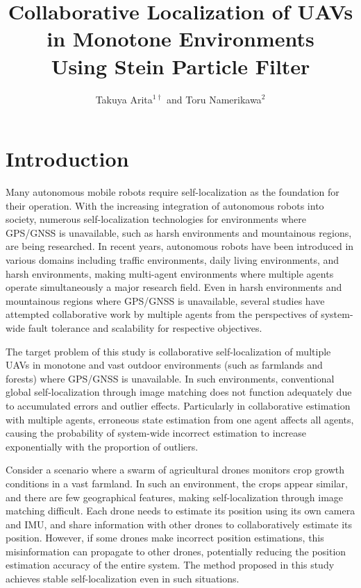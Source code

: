 \documentclass[a4paper,fleqn,10pt,twocolumn]{SICE_ISCS}
\title{Collaborative Localization of UAVs in Monotone Environments\\
	 Using Stein Particle Filter}
\author{Takuya Arita${}^{1\dagger}$ and Toru Namerikawa${}^{2}$}
\begin{document}
\maketitle


\section{Introduction}
Many autonomous mobile robots require self-localization as the foundation for their operation. With the increasing integration of autonomous robots into society, numerous self-localization technologies for environments where GPS/GNSS is unavailable, such as harsh environments and mountainous regions, are being researched. In recent years, autonomous robots have been introduced in various domains including traffic environments, daily living environments, and harsh environments, making multi-agent environments where multiple agents operate simultaneously a major research field. Even in harsh environments and mountainous regions where GPS/GNSS is unavailable, several studies have attempted collaborative work by multiple agents from the perspectives of system-wide fault tolerance and scalability for respective objectives.

The target problem of this study is collaborative self-localization of multiple UAVs in monotone and vast outdoor environments (such as farmlands and forests) where GPS/GNSS is unavailable. In such environments, conventional global self-localization through image matching does not function adequately due to accumulated errors and outlier effects. Particularly in collaborative estimation with multiple agents, erroneous state estimation from one agent affects all agents, causing the probability of system-wide incorrect estimation to increase exponentially with the proportion of outliers.

Consider a scenario where a swarm of agricultural drones monitors crop growth conditions in a vast farmland. In such an environment, the crops appear similar, and there are few geographical features, making self-localization through image matching difficult. Each drone needs to estimate its position using its own camera and IMU, and share information with other drones to collaboratively estimate its position. However, if some drones make incorrect position estimations, this misinformation can propagate to other drones, potentially reducing the position estimation accuracy of the entire system. The method proposed in this study achieves stable self-localization even in such situations.
\end{document}
